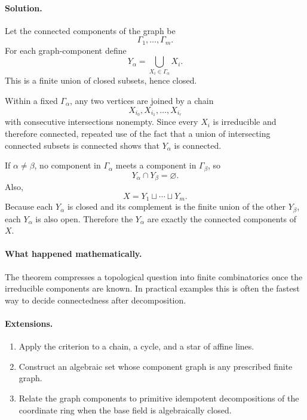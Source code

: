 \paragraph{Solution.}
Let the connected components of the graph be
\[
\Gamma_1,\dots,\Gamma_m.
\]
For each graph-component define
\[
Y_\alpha
=
\bigcup_{X_i\in\Gamma_\alpha}X_i.
\]
This is a finite union of closed subsets, hence closed.

Within a fixed \(\Gamma_\alpha\), any two vertices are joined by a chain
\[
X_{i_0},X_{i_1},\dots,X_{i_r}
\]
with consecutive intersections nonempty.  Since every \(X_i\) is irreducible and therefore
connected, repeated use of the fact that a union of intersecting connected subsets is
connected shows that \(Y_\alpha\) is connected.

If \(\alpha\neq\beta\), no component in \(\Gamma_\alpha\) meets a component in
\(\Gamma_\beta\), so
\[
Y_\alpha\cap Y_\beta=\varnothing.
\]
Also,
\[
X=Y_1\sqcup\cdots\sqcup Y_m.
\]
Because each \(Y_\alpha\) is closed and its complement is the finite union of the other
\(Y_\beta\), each \(Y_\alpha\) is also open.  Therefore the \(Y_\alpha\) are exactly the
connected components of \(X\).

\paragraph{What happened mathematically.}
The theorem compresses a topological question into finite combinatorics once the
irreducible components are known.  In practical examples this is often the fastest way to
decide connectedness after decomposition.

\paragraph{Extensions.}
\begin{enumerate}
\item Apply the criterion to a chain, a cycle, and a star of affine lines.
\item Construct an algebraic set whose component graph is any prescribed finite graph.
\item Relate the graph components to primitive idempotent decompositions of the coordinate
ring when the base field is algebraically closed.
\end{enumerate}
\fi
